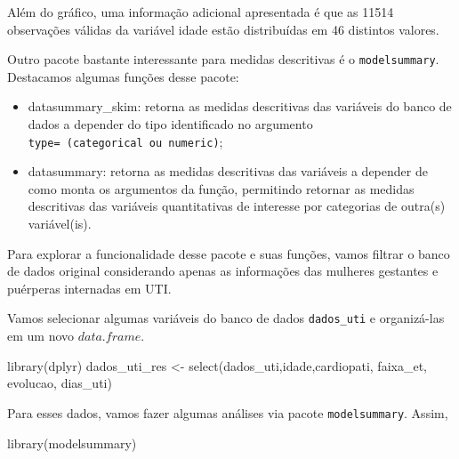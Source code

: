\documentclass[
  letterpaper,
  DIV=11,
  numbers=noendperiod]{scrreprt}
\newenvironment{Shaded}{\begin{snugshade}}{\end{snugshade}}
\newcommand{\FunctionTok}[1]{\textcolor[rgb]{0.28,0.35,0.67}{#1}}
\newcommand{\NormalTok}[1]{\textcolor[rgb]{0.00,0.23,0.31}{#1}}
\newcommand{\OtherTok}[1]{\textcolor[rgb]{0.00,0.23,0.31}{#1}}
\newcommand{\SpecialCharTok}[1]{\textcolor[rgb]{0.37,0.37,0.37}{#1}}
\begin{document}
Além do gráfico, uma informação adicional apresentada é que as 11514
observações válidas da variável idade estão distribuídas em 46 distintos
valores.

Outro pacote bastante interessante para medidas descritivas é o
\texttt{modelsummary}. Destacamos algumas funções desse pacote:

\begin{itemize}
\item
  datasummary\_skim: retorna as medidas descritivas das variáveis do
  banco de dados a depender do tipo identificado no argumento
  \texttt{type=\ (categorical\ ou\ numeric)};
\item
  datasummary: retorna as medidas descritivas das variáveis a depender
  de como monta os argumentos da função, permitindo retornar as medidas
  descritivas das variáveis quantitativas de interesse por categorias de
  outra(s) variável(is).
\end{itemize}

Para explorar a funcionalidade desse pacote e suas funções, vamos
filtrar o banco de dados original considerando apenas as informações das
mulheres gestantes e puérperas internadas em UTI.

\begin{Shaded}
\end{Shaded}

Vamos selecionar algumas variáveis do banco de dados \texttt{dados\_uti}
e organizá-las em um novo \(data.frame\).

\begin{Shaded}
\begin{Highlighting}[]
\FunctionTok{library}\NormalTok{(dplyr)}
\NormalTok{dados\_uti\_res }\OtherTok{\textless{}{-}} \FunctionTok{select}\NormalTok{(dados\_uti,idade,cardiopati, faixa\_et, evolucao, dias\_uti)}
\end{Highlighting}
\end{Shaded}

Para esses dados, vamos fazer algumas análises via pacote
\texttt{modelsummary}. Assim,

\begin{Shaded}
\begin{Highlighting}[]
\FunctionTok{library}\NormalTok{(modelsummary)}
\end{Highlighting}
\end{Shaded}
\end{document}
